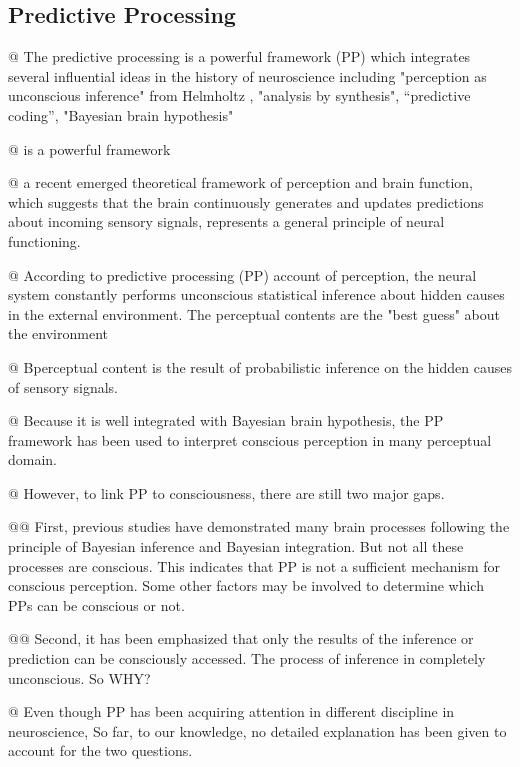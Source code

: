 \documentclass[utf8]{article}
\newenvironment{ants}
			{
			 \begin{easylist}[itemize]
		 	}
			{
			\end{easylist}
			} %
\begin{document}
		\subsection{Predictive Processing}
			\begin{ants}
				@ The predictive processing is a powerful framework (PP) which integrates several influential ideas in the history of neuroscience including "perception as unconscious inference" from Helmholtz \citet{helmholtz1866concerning}, "analysis by synthesis", “predictive coding”, "Bayesian brain hypothesis"


				@ is a powerful framework


				@ a recent emerged theoretical framework of perception and brain function, which suggests that the brain continuously generates and updates predictions about incoming sensory signals, represents a general principle of neural functioning.


				@ According to predictive processing (PP) account of perception, the neural system constantly performs unconscious statistical inference about hidden causes in the external environment. The perceptual contents are the "best guess" about the environment 	\cite{clark_2013}			\cite{Hohwy2013}

				@ Bperceptual content is the result of probabilistic inference on the hidden causes of sensory signals.


				@ Because it is well integrated with Bayesian brain hypothesis, the PP framework has been used to interpret conscious perception in many perceptual domain. \cite{Hohwy2013} \cite{SethPP2014}



				@ However, to link PP to consciousness, there are still two major gaps.


					@@ First, previous studies have demonstrated many brain processes following the principle of Bayesian inference and Bayesian integration. But not all these processes are conscious. This indicates that PP is not a sufficient mechanism for conscious perception. Some other factors may be involved to determine which PPs can be conscious or not.


					@@ Second, it has been emphasized that only the results of the inference or prediction can be consciously accessed. The process of inference in completely unconscious. So WHY?

				@ Even though PP has been acquiring attention in different discipline in neuroscience, So far, to our knowledge, no detailed explanation has been given to account for the two questions.





\end{ants}
\end{document}
